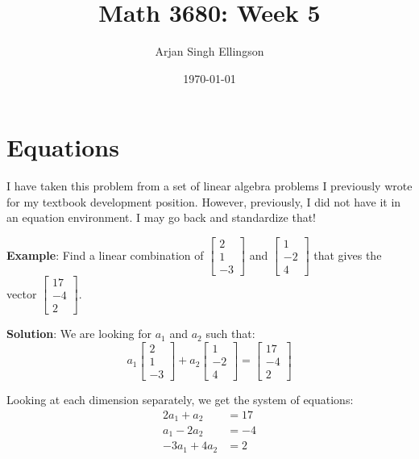 \documentclass{article} %
\title{Math 3680: Week 5}
\author{Arjan Singh Ellingson}
\date{\today}
\begin{document}
\maketitle

\section{Equations}
I have taken this problem from a set of linear algebra problems I previously wrote for my textbook development position. However, previously, I did not have it in an equation environment. I may go back and standardize that!

\textbf{Example}: Find a linear combination of 
$\begin{bmatrix} 2 \\ 1 \\ -3 \end{bmatrix}$ and 
$\begin{bmatrix} 1 \\ -2 \\ 4 \end{bmatrix}$ 
that gives the vector 
$\begin{bmatrix} 17 \\ -4 \\ 2 \end{bmatrix}$.

\textbf{Solution}: We are looking for $a_1$ and $a_2$ such that:
\begin{equation*}
a_1 \begin{bmatrix} 2 \\ 1 \\ -3 \end{bmatrix}
+ 
a_2 \begin{bmatrix} 1 \\ -2 \\ 4 \end{bmatrix}
=
\begin{bmatrix} 17 \\ -4 \\ 2 \end{bmatrix}
\end{equation*}

Looking at each dimension separately, we get the system of equations:
\begin{align*}
2a_1 + a_2 &= 17 \\
a_1 - 2a_2 &= -4 \\
-3a_1 + 4a_2 &= 2
\end{align*}
\end{document}

